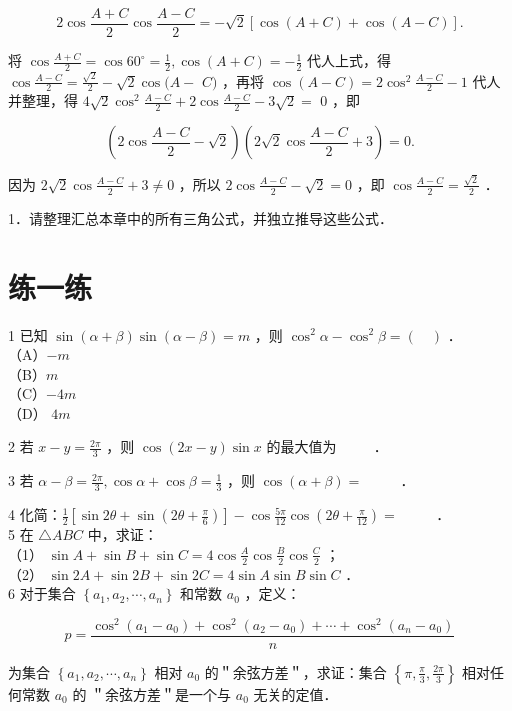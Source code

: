 \documentclass[10pt]{article}
\begin{document}
\[
2 \cos \frac{A+C}{2} \cos \frac{A-C}{2}=-\sqrt{2}[\cos (A+C)+\cos (A-C)] .
\]

将 \(\cos \frac{A+C}{2}=\cos 60^{\circ}=\frac{1}{2}, \cos (A+C)=-\frac{1}{2}\) 代人上式，得 \(\cos \frac{A-C}{2}=\frac{\sqrt{2}}{2}-\sqrt{2} \cos (A-\) \(C)\) ，再将 \(\cos (A-C)=2 \cos ^{2} \frac{A-C}{2}-1\) 代人并整理，得 \(4 \sqrt{2} \cos ^{2} \frac{A-C}{2}+2 \cos \frac{A-C}{2}-3 \sqrt{2}=\) 0 ，即

\[
\left(2 \cos \frac{A-C}{2}-\sqrt{2}\right)\left(2 \sqrt{2} \cos \frac{A-C}{2}+3\right)=0 .
\]

因为 \(2 \sqrt{2} \cos \frac{A-C}{2}+3 \neq 0\) ，所以 \(2 \cos \frac{A-C}{2}-\sqrt{2}=0\) ，即 \(\cos \frac{A-C}{2}=\frac{\sqrt{2}}{2}\) ．

1．请整理汇总本章中的所有三角公式，并独立推导这些公式．

\section*{练一练}
1 已知 \(\sin (\alpha+\beta) \sin (\alpha-\beta)=m\) ，则 \(\cos ^{2} \alpha-\cos ^{2} \beta=(\quad)\) ．\\
（A）\(-m\)\\
（B）\(m\)\\
（C）\(-4 m\)\\
（D） \(4 m\)

2 若 \(x-y=\frac{2 \pi}{3}\) ，则 \(\cos (2 x-y) \sin x\) 的最大值为 \(\qquad\) ．

3 若 \(\alpha-\beta=\frac{2 \pi}{3}, \cos \alpha+\cos \beta=\frac{1}{3}\) ，则 \(\cos (\alpha+\beta)=\) \(\qquad\) ．

4 化简：\(\frac{1}{2}\left[\sin 2 \theta+\sin \left(2 \theta+\frac{\pi}{6}\right)\right]-\cos \frac{5 \pi}{12} \cos \left(2 \theta+\frac{\pi}{12}\right)=\) \(\qquad\) ．\\
5 在 \(\triangle A B C\) 中，求证：\\
（1） \(\sin A+\sin B+\sin C=4 \cos \frac{A}{2} \cos \frac{B}{2} \cos \frac{C}{2}\) ；\\
（2） \(\sin 2 A+\sin 2 B+\sin 2 C=4 \sin A \sin B \sin C\) ．\\
6 对于集合 \(\left\{a_{1}, a_{2}, \cdots, a_{n}\right\}\) 和常数 \(a_{0}\) ，定义：

\[
p=\frac{\cos ^{2}\left(a_{1}-a_{0}\right)+\cos ^{2}\left(a_{2}-a_{0}\right)+\cdots+\cos ^{2}\left(a_{n}-a_{0}\right)}{n}
\]

为集合 \(\left\{a_{1}, a_{2}, \cdots, a_{n}\right\}\) 相对 \(a_{0}\) 的＂余弦方差＂，求证：集合 \(\left\{\pi, \frac{\pi}{3}, \frac{2 \pi}{3}\right\}\) 相对任何常数 \(a_{0}\) 的 ＂余弦方差＂是一个与 \(a_{0}\) 无关的定值．
\end{document}
